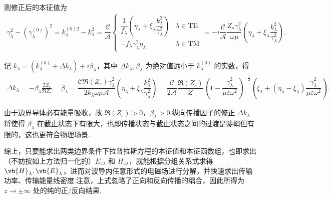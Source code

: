 则修正后的本征值为
\begin{align*}
	\gamma_{\lambda}^2 - (\gamma_{\lambda}^{(0)})^2 = k_{\lambda}^{(0)2} - k_{\lambda}^2 = \dfrac{\mathcal{C}}{\mathcal{A}} \begin{cases}
		\dfrac{1}{f_{\lambda}} \left( \eta_{\lambda} + \xi_{\lambda} \dfrac{k_{\lambda}^2}{\gamma_{\lambda}^2} \right) & \lambda \in \text{TE} \\
		- f_{\lambda} \gamma_{\lambda}^2 \eta_{\lambda}                                                                & \lambda \in \text{TM}
	\end{cases} = -i \dfrac{\mathcal{C}}{\mathcal{A}} \dfrac{Z_s \gamma_{\lambda}^2}{\omega\mu} \left( \eta_{\lambda} + \xi_{\lambda} \dfrac{k_{\lambda}^2}{\gamma_{\lambda}^2} \right).
\end{align*}

记 \(k_{\lambda} = (k_{\lambda}^{(0)} + \Delta k_{\lambda}) + i \beta_{\lambda}\)，其中 \(\Delta k_{\lambda}, \beta_{\lambda}\) 为绝对值远小于 \(k_{\lambda}^{(0)}\) 的实数，得
\begin{align*}
	\Delta k_{\lambda} = -\beta_{\lambda} \frac{\Im Z_s}{\Re Z_s}. \quad \beta_{\lambda} = \dfrac{\mathcal{C}\Re(Z_s)\gamma_{\lambda}^2}{2 k_{\lambda}\omega\mu \mathcal{A}} \left( \eta_{\lambda} + \xi_{\lambda} \dfrac{k_{\lambda}^2}{\gamma_{\lambda}^2} \right) = \dfrac{\mathcal{C}}{2 \mathcal{A}} \dfrac{\Re(Z_s)}{Z} \left( 1 - \dfrac{\gamma_{\lambda}^2}{\mu\varepsilon\omega^2} \right)^{-\frac{1}{2}} \left( \xi_{\lambda} + (\eta_{\lambda} - \xi_{\lambda}) \dfrac{\gamma_{\lambda}^2}{\mu\varepsilon\omega^2} \right).
\end{align*}

由于边界导体必有能量吸收，故 \(\Re(Z_s) > 0\)，\(\beta_{\lambda} > 0\).纵向传播因子的修正 \(\Delta k_{\lambda}\) 将使得 \(\beta_{\lambda}\) 在截止状态下有限大，也即传播状态与截止状态之间的过渡是陡峭但有限的，这也更符合物理场景.

综上，只要能求出两类边界条件下拉普拉斯方程的本征值和本征函数组，也即求出（不妨按如上方法归一化的）\(E_{z\lambda}\) 和 \(H_{z\lambda}\)，就能根据分组关系式求得 \(\vb{H}_{\lambda}, \vb{E}_{\lambda}\)，进而对波导内任意形式的电磁场进行分解，并快速求出传输功率、传输能量线密度.注意，上式忽略了正向和反向传播的耦合，因此所得为 \(z \to \pm\infty\) 处的纯的正/反向结果.

